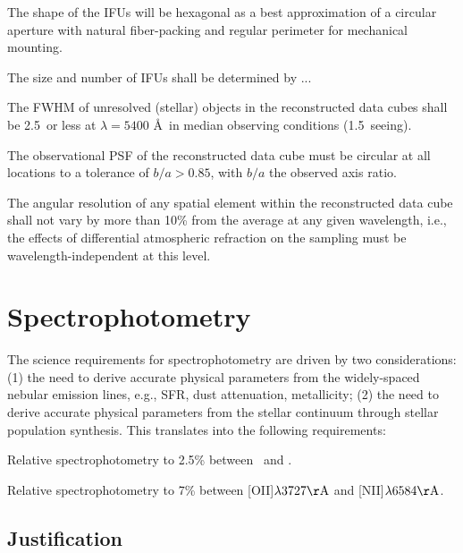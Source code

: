 \documentclass[11pt,a4paper,twoside,onecolumn,openany,final,oldfontcommands]{memoir}
\begin{document}
\begin{requirement}

\reqitem The shape of the IFUs will be hexagonal as a best approximation of a circular aperture with natural fiber-packing and regular perimeter for mechanical mounting.

\reqitem The size and number of IFUs shall be determined by ...

\reqitem The FWHM of unresolved (stellar) objects in the reconstructed data cubes shall be 2.5\arcsec\ or less at $\lambda = 5400$ \AA\ in median observing conditions (1.5\arcsec\ seeing).

\reqitem The observational PSF of the reconstructed data cube must be circular at all locations to a tolerance of $b/a > 0.85$, with $b/a$ the observed axis ratio.

\reqitem The angular resolution of any spatial element within the reconstructed data cube shall not vary by more than 10\% from the average at any given wavelength, i.e., the effects of differential atmospheric refraction on the sampling must be wavelength-independent at this level.

\end{requirement}

\section{Spectrophotometry}
\label{sec:spectrophotometry}

The science requirements for spectrophotometry are driven by two considerations: (1) the need to derive accurate physical parameters from the widely-spaced nebular emission lines, e.g., SFR, dust attenuation, metallicity; (2) the need to derive accurate physical parameters from the stellar continuum through stellar population synthesis. This translates into the following requirements:

\begin{requirement}

\reqitem Relative spectrophotometry to 2.5\% between \Halpha\ and \Hbeta.
    
\reqitem Relative spectrophotometry to 7\% between [OII]$\lambda3727{\rm \AA}$ and [NII]$\lambda6584{\rm \AA}$. 
    
\end{requirement}

\subsection{Justification}
\end{document}
